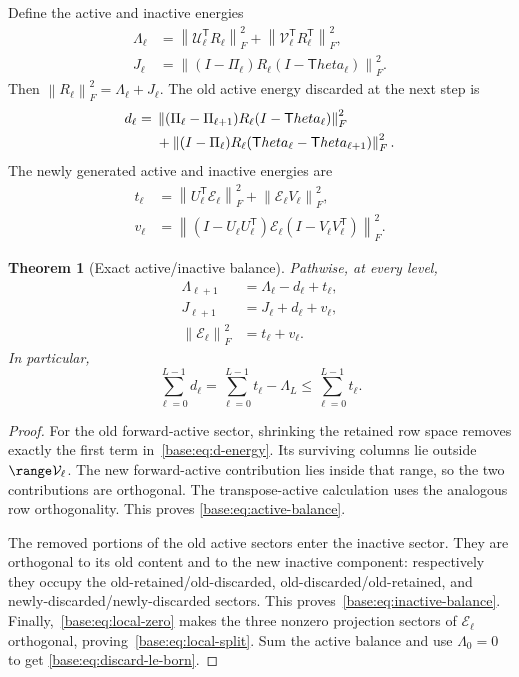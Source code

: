 \documentclass[11pt,oneside,openany,a4paper]{book}
\numberwithin{equation}{chapter}
\newtheorem{theorem}{Theorem}[chapter]
\theoremstyle{definition}
\theoremstyle{remark}
\newcommand{\T}{\mathsf T}\newcommand{\Id}{I}
\newcommand{\F}[1]{\left\lVert#1\right\rVert_F}
\newcommand{\UC}{\mathcal U}\newcommand{\VC}{\mathcal V}\newcommand{\err}{\mathcal E}
\begin{document}
Define the active and inactive energies
\begin{align}
 \Lambda_\ell&=\F{\UC_\ell^{\T} R_\ell}^2
                   +\F{\VC_\ell^{\T} R_\ell^{\T}}^2,\label{base:eq:active}\\
 J_\ell&=\F{(I-\Pi_\ell)R_\ell(I-\T heta_\ell)}^2.\label{base:eq:inactive}
\end{align}
Then $\F{R_\ell}^2=\Lambda_\ell+J_\ell$.
The old active energy discarded at the next step is
\begin{align}
 d_\ell={}&\F{(\Pi_\ell-\Pi_{\ell+1})R_\ell(I-\T heta_\ell)}^2\notag\\
 &+\F{(I-\Pi_\ell)R_\ell(\T heta_\ell-\T heta_{\ell+1})}^2.
                                                        \label{base:eq:d-energy}
\end{align}
The newly generated active and inactive energies are
\begin{align}
 t_\ell&=\F{U_\ell^{\T}\err_\ell}^2+\F{\err_\ell V_\ell}^2,
                                                        \label{base:eq:t-energy}\\
 v_\ell&=\F{(I-U_\ell U_\ell^{\T})\err_\ell
                      (I-V_\ell V_\ell^{\T})}^2.           \label{base:eq:v-energy}
\end{align}

\begin{theorem}[Exact active/inactive balance]\label{base:thm:balance}
Pathwise, at every level,
\begin{align}
 \Lambda_{\ell+1}&=\Lambda_\ell-d_\ell+t_\ell,\label{base:eq:active-balance}\\
 J_{\ell+1}&=J_\ell+d_\ell+v_\ell,\label{base:eq:inactive-balance}\\
 \F{\err_\ell}^2&=t_\ell+v_\ell.\label{base:eq:local-split}
\end{align}
In particular,
\begin{equation}\label{base:eq:discard-le-born}
 \sum_{\ell=0}^{L-1}d_\ell
 =\sum_{\ell=0}^{L-1}t_\ell-\Lambda_L
 \le\sum_{\ell=0}^{L-1}t_\ell.
\end{equation}
\end{theorem}
\begin{proof}
For the old forward-active sector, shrinking the retained row space removes
exactly the first term in~\eqref{base:eq:d-energy}. Its surviving columns lie
outside $\range\VC_\ell$. The new forward-active contribution lies inside
that range, so the two contributions are orthogonal. The transpose-active
calculation uses the analogous row orthogonality. This proves
\eqref{base:eq:active-balance}.

The removed portions of the old active sectors enter the inactive sector.
They are orthogonal to its old content and to the new inactive component:
respectively they occupy the old-retained/old-discarded,
old-discarded/old-retained, and newly-discarded/newly-discarded sectors.
This proves~\eqref{base:eq:inactive-balance}.
Finally,~\eqref{base:eq:local-zero} makes the three nonzero projection sectors of
$\err_\ell$ orthogonal, proving~\eqref{base:eq:local-split}.
Sum the active balance and use $\Lambda_0=0$ to get
\eqref{base:eq:discard-le-born}.\end{proof}
\end{document}
